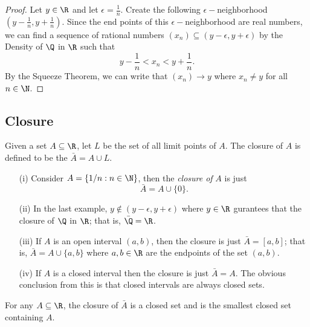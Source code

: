 \begin{proof}
    Let \( y \in \R  \) and let \( \epsilon = \frac{ 1 }{ n }  \). Create the following \( \epsilon- \)neighborhood \( (y-\frac{ 1 }{ n }, y + \frac{ 1 }{ n } ) \). Since the end points of this \( \epsilon- \)neighborhood are real numbers, we can find a sequence of rational numbers \( (x_n) \subseteq (y - \epsilon , y + \epsilon  )\) by the Density of \( \Q \) in \( \R \) such that 
    \[ y - \frac{ 1 }{ n } < x_n < y + \frac{ 1 }{ n }. \]
    By the Squeeze Theorem, we can write that \( (x_n) \to y \) where \( x_n \neq y \) for all \( n \in \N  \). 
\end{proof}

\subsection{Closure}

\begin{tcolorbox}
\begin{defn}
    Given a set \( A \subseteq \R  \), let \( L \) be the set of all limit points of \( A \). The closure of \( A \) is defined to be the \( \bar{A} = A \cup L \). 
\end{defn}
\end{tcolorbox}

\begin{ex}
\begin{enumerate}
    \item[(i)] Consider \( A = \{ 1/n : n \in \N  \}  \), then the \textit{closure of} \( A \) is 
    just 
    \[ \bar{A} = A \cup \{ 0 \}. \]
\item[(ii)] In the last example, \( y \notin (y- \epsilon , y + \epsilon ) \) where \( y \in \R  \) gurantees that the closure of \( \Q  \) in \( \R  \); that is, \( \bar{\Q} = \R  \). 
\item[(iii)] If \( A \) is an open interval \( (a,b) \), then the closure is just \( \bar{A} = [a,b] \); that is, \( \bar{A} = A \cup \{ a,b \}  \) where \( a,b \in \R  \) are the endpoints of the set \( (a,b) \). 
\item[(iv)]If \( A \) is a closed interval then the closure is just \( \bar{A} = A  \). The obvious conclusion from this is that closed intervals are always closed sets. 
\end{enumerate}
\end{ex}

\begin{tcolorbox}
\begin{thm}
    For any \( A \subseteq \R  \), the closure of \( \bar{A} \) is a closed set and is the smallest closed set containing \( A \). 
\end{thm}
\end{tcolorbox}

